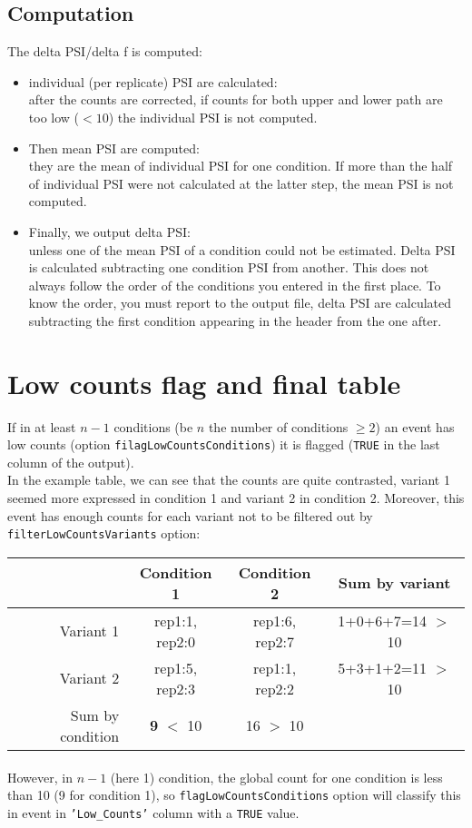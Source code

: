 \documentclass[english, a4paper, 12pt]{article}
\begin{document}
\subsection{Computation}
The delta PSI/delta f is computed:
 \begin{itemize}
\item individual (per replicate) PSI are calculated:\\
after the counts are corrected, if counts for both upper and lower path are too low ($<10$) the individual PSI is not computed.
\item Then mean PSI are computed:\\
they are the mean of individual PSI for one condition. If more than the half of individual PSI were not calculated at the latter step, the mean PSI is not computed.
\item Finally, we output delta PSI:\\
unless one of the mean PSI of a condition could not be estimated. Delta PSI is calculated subtracting one condition PSI from another. This does not always follow the order of the conditions you entered in the first place. To know the order, you must report to the output file, delta PSI are calculated subtracting the first condition appearing in the header from the one after.
\end{itemize}


\section{Low counts flag and final table}
If in at least $n-1$ conditions (be $n$ the number of conditions $\geq 2$) an event has low counts (option \texttt{filagLowCountsConditions}) it is flagged (\texttt{TRUE} in the last column of the output).\\
In the example table, we can see that the counts are quite contrasted, variant 1 seemed more expressed in condition 1 and variant 2 in condition 2. Moreover, this event has enough counts for each variant not to be filtered out by \texttt{filterLowCountsVariants} option:\\

\begin{tabular}{r|c|c|c}
  \hline
   & Condition 1 & Condition 2& Sum by variant \\
  \hline
  Variant 1 &	rep1:1, rep2:0 & rep1:6, rep2:7&  1+0+6+7=14 $>$ 10 \\
 Variant 2 &	rep1:5, rep2:3 & rep1:1, rep2:2&  5+3+1+2=11 $>$ 10 \\
  \hline
 Sum by condition &	\textbf{9} $<$ 10 	&16 $>$ 10 & \\ 	
  \hline
\end{tabular}

\paragraph{}However, in $n-1$ (here 1) condition, the global count for one condition is less than 10 (9 for condition 1), so \texttt{flagLowCountsConditions} option will classify this in event in \texttt{'Low\_Counts'} column with a \texttt{TRUE} value. 
\end{document}

